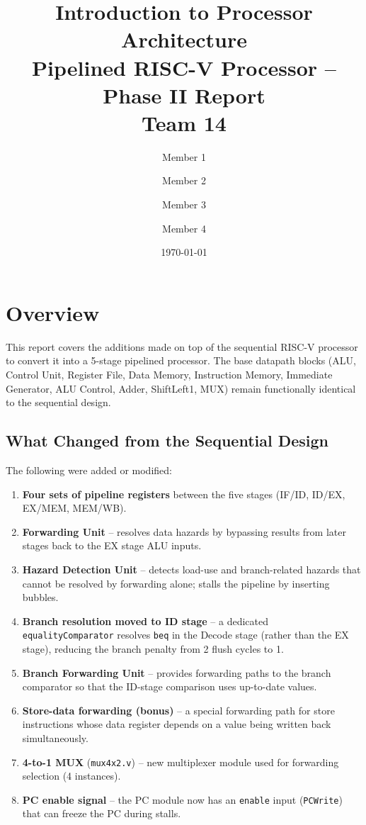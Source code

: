 \documentclass[12pt,a4paper]{article}
\title{%
    \vspace{-1cm}
    \textbf{Introduction to Processor Architecture}\\[6pt]
    \Large Pipelined RISC-V Processor -- Phase II Report\\[4pt]
    \large Team 14
}
\author{
    Member 1 \and Member 2 \and Member 3 \and Member 4
}
\date{\today}
\begin{document}
\maketitle
\thispagestyle{empty}
\newpage

\tableofcontents
\newpage

\section{Overview}

This report covers the additions made on top of the sequential RISC-V processor to convert it into a 5-stage pipelined processor.
The base datapath blocks (ALU, Control Unit, Register File, Data Memory, Instruction Memory, Immediate Generator, ALU Control, Adder, ShiftLeft1, MUX) remain functionally identical to the sequential design.

\subsection{What Changed from the Sequential Design}
The following were added or modified:
\begin{enumerate}
    \item \textbf{Four sets of pipeline registers} between the five stages (IF/ID, ID/EX, EX/MEM, MEM/WB).
    \item \textbf{Forwarding Unit} -- resolves data hazards by bypassing results from later stages back to the EX stage ALU inputs.
    \item \textbf{Hazard Detection Unit} -- detects load-use and branch-related hazards that cannot be resolved by forwarding alone; stalls the pipeline by inserting bubbles.
    \item \textbf{Branch resolution moved to ID stage} -- a dedicated \texttt{equalityComparator} resolves \texttt{beq} in the Decode stage (rather than the EX stage), reducing the branch penalty from 2 flush cycles to 1.
    \item \textbf{Branch Forwarding Unit} -- provides forwarding paths to the branch comparator so that the ID-stage comparison uses up-to-date values.
    \item \textbf{Store-data forwarding (bonus)} -- a special forwarding path for store instructions whose data register depends on a value being written back simultaneously.
    \item \textbf{4-to-1 MUX} (\texttt{mux4x2.v}) -- new multiplexer module used for forwarding selection (4 instances).
    \item \textbf{PC enable signal} -- the PC module now has an \texttt{enable} input (\texttt{PCWrite}) that can freeze the PC during stalls.
\end{enumerate}
\end{document}
